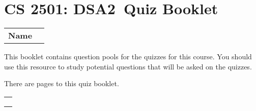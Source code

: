 \documentclass[10pt]{article}
\def\course{CS 2501: DSA2}
\def\exam{Quiz Booklet}
\begin{document}
\section*{\course\ \exam}

\vspace{0.1in}

\begin{tabular}{ll}
\Large\bf\hspace{-0.125in} Name & \hspace*{5in} \\ \cline{2-2}
\end{tabular}

\vspace{0.35in}

\noindent This booklet contains question pools for the quizzes for this course. You should use this resource to study potential questions that will be asked on the quizzes.

\vspace{12pt}

\noindent There are \pageref{LastPage} pages to this quiz booklet.

\vspace{12pt}

\begin{center}
\noindent \begin{tabular}{c} \hline
\hspace*{6in}\vspace{0.25in}\\ \hline
\hspace*{6in}\vspace{0.25in}\\ \hline
\hspace*{6in}\vspace{0.25in}\\ \hline
\hspace*{6in}\vspace{0.25in}\\ \hline
\end{tabular}
\end{center}

\vspace{0.15in}
\end{document}
